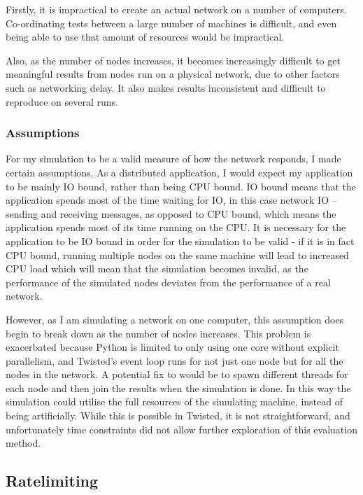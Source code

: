 \documentclass[12pt,twoside,notitlepage]{report}
\begin{document}
Firstly, it is impractical to create an actual network on a number of computers. Co-ordinating
tests between a large number of machines is difficult, and even being able to use that amount of
resources would be impractical.

Also, as the number of nodes increases, it becomes increasingly difficult to get meaningful
results from nodes run on a physical network, due to other factors such as networking delay. It
also makes results inconsistent and difficult to reproduce on several runs.

\subsubsection*{Assumptions}

For my simulation to be a valid measure of how the network responds, I made certain assumptions.
As a distributed application, I would expect my application to be mainly IO bound, rather than
being CPU bound. IO bound means that the application spends most of the time waiting for IO, in
this case network IO -- sending and receiving messages, as opposed to CPU bound, which means the
application spends most of its time running on the CPU. It is necessary for the application to be
IO bound in order for the simulation to be valid - if it is in fact CPU bound, running multiple
nodes on the same machine will lead to increased CPU load which will mean that the simulation
becomes invalid, as the performance of the simulated nodes deviates from the performance of a real
network.

However, as I am simulating a network on one computer, this assumption does begin to
break down as the number of nodes increases. This problem is exacerbated because Python is
limited to only using one core without explicit parallelism, and Twisted's event loop runs
for not just one node but for all the nodes in the network. A potential fix to would be to spawn
different threads for each node and then join the results when the simulation is done. In this way
the simulation could utilise the full resources of the simulating machine, instead of being
artificially. While this is possible in Twisted, it is not straightforward, and unfortunately time
constraints did not allow further exploration of this evaluation method.

\subsection{Ratelimiting}
\end{document}
